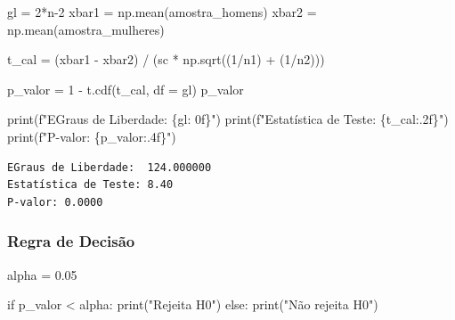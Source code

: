 \documentclass[
  letterpaper,
  DIV=11,
  numbers=noendperiod]{scrreprt}
\newenvironment{Shaded}{\begin{snugshade}}{\end{snugshade}}
\newcommand{\BuiltInTok}[1]{\textcolor[rgb]{0.00,0.23,0.31}{#1}}
\newcommand{\ControlFlowTok}[1]{\textcolor[rgb]{0.00,0.23,0.31}{#1}}
\newcommand{\DecValTok}[1]{\textcolor[rgb]{0.68,0.00,0.00}{#1}}
\newcommand{\FloatTok}[1]{\textcolor[rgb]{0.68,0.00,0.00}{#1}}
\newcommand{\NormalTok}[1]{\textcolor[rgb]{0.00,0.23,0.31}{#1}}
\newcommand{\OperatorTok}[1]{\textcolor[rgb]{0.37,0.37,0.37}{#1}}
\newcommand{\SpecialCharTok}[1]{\textcolor[rgb]{0.37,0.37,0.37}{#1}}
\newcommand{\SpecialStringTok}[1]{\textcolor[rgb]{0.13,0.47,0.30}{#1}}
\newcommand{\StringTok}[1]{\textcolor[rgb]{0.13,0.47,0.30}{#1}}
\begin{document}
\begin{Shaded}
\begin{Highlighting}[]
\NormalTok{gl }\OperatorTok{=} \DecValTok{2}\OperatorTok{*}\NormalTok{n}\OperatorTok{{-}}\DecValTok{2}
\NormalTok{xbar1 }\OperatorTok{=}\NormalTok{ np.mean(amostra\_homens)}
\NormalTok{xbar2 }\OperatorTok{=}\NormalTok{ np.mean(amostra\_mulheres)}

\NormalTok{t\_cal }\OperatorTok{=}\NormalTok{ (xbar1 }\OperatorTok{{-}}\NormalTok{ xbar2) }\OperatorTok{/}\NormalTok{ (sc }\OperatorTok{*}\NormalTok{ np.sqrt((}\DecValTok{1}\OperatorTok{/}\NormalTok{n1) }\OperatorTok{+}\NormalTok{ (}\DecValTok{1}\OperatorTok{/}\NormalTok{n2)))}

\NormalTok{p\_valor }\OperatorTok{=} \DecValTok{1} \OperatorTok{{-}}\NormalTok{ t.cdf(t\_cal, df }\OperatorTok{=}\NormalTok{ gl)}
\NormalTok{p\_valor}

\BuiltInTok{print}\NormalTok{(}\SpecialStringTok{f"EGraus de Liberdade: }\SpecialCharTok{\{}\NormalTok{gl}\SpecialCharTok{: 0f\}}\SpecialStringTok{"}\NormalTok{)}
\BuiltInTok{print}\NormalTok{(}\SpecialStringTok{f"Estatística de Teste: }\SpecialCharTok{\{}\NormalTok{t\_cal}\SpecialCharTok{:.2f\}}\SpecialStringTok{"}\NormalTok{)}
\BuiltInTok{print}\NormalTok{(}\SpecialStringTok{f"P{-}valor: }\SpecialCharTok{\{}\NormalTok{p\_valor}\SpecialCharTok{:.4f\}}\SpecialStringTok{"}\NormalTok{)}
\end{Highlighting}
\end{Shaded}

\begin{verbatim}
EGraus de Liberdade:  124.000000
Estatística de Teste: 8.40
P-valor: 0.0000
\end{verbatim}

\subsubsection{Regra de Decisão}\label{regra-de-decisuxe3o-4}

\begin{Shaded}
\begin{Highlighting}[]
\NormalTok{alpha }\OperatorTok{=} \FloatTok{0.05} 

\ControlFlowTok{if}\NormalTok{ p\_valor }\OperatorTok{\textless{}}\NormalTok{ alpha: }
  \BuiltInTok{print}\NormalTok{(}\StringTok{"Rejeita H0"}\NormalTok{) }
\ControlFlowTok{else}\NormalTok{: }
  \BuiltInTok{print}\NormalTok{(}\StringTok{"Não rejeita H0"}\NormalTok{)}
\end{Highlighting}
\end{Shaded}
\end{document}
